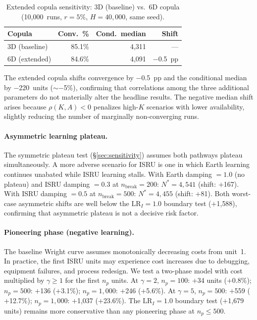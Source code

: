\documentclass[preprint,12pt]{elsarticle}
\begin{document}
\begin{table}[htbp]
\centering
\caption{Extended copula sensitivity: 3D (baseline) vs.\ 6D copula (10{,}000~runs, $r = 5\%$, $H = 40{,}000$, same seed).}
\label{tab:copula_6d}
\small
\begin{tabular}{@{}lrrr@{}}
\toprule
Copula & Conv.\ \% & Cond.\ median & Shift \\
\midrule
3D (baseline) & 85.1\% & 4{,}311 & --- \\
6D (extended) & 84.6\% & 4{,}091 & $-$0.5~pp \\
\bottomrule
\end{tabular}
\end{table}

The extended copula shifts convergence by $-$0.5~pp and the conditional median by $-$220~units (${\sim}-$5\%), confirming that correlations among the three additional parameters do not materially alter the headline results. The negative median shift arises because $\rho(K, A) < 0$ penalizes high-$K$ scenarios with lower availability, slightly reducing the number of marginally non-converging runs.

\paragraph{Asymmetric learning plateau.} The symmetric plateau test (\S\ref{sec:sensitivity}) assumes both pathways plateau simultaneously. A more adverse scenario for ISRU is one in which Earth learning continues unabated while ISRU learning stalls. With Earth damping $= 1.0$ (no plateau) and ISRU damping $= 0.3$ at $n_{\mathrm{break}} = 200$: $N^* = 4{,}541$ (shift: $+$167). With ISRU damping $= 0.5$ at $n_{\mathrm{break}} = 500$: $N^* = 4{,}455$ (shift: $+$81). Both worst-case asymmetric shifts are well below the $\mathrm{LR}_I = 1.0$ boundary test ($+$1{,}588), confirming that asymmetric plateau is not a decisive risk factor.

\paragraph{Pioneering phase (negative learning).} The baseline Wright curve assumes monotonically decreasing costs from unit~1. In practice, the first ISRU units may experience cost increases due to debugging, equipment failures, and process redesign. We test a two-phase model with cost multiplied by $\gamma \geq 1$ for the first $n_p$ units. At $\gamma = 2$, $n_p = 100$: $+$34 units ($+$0.8\%); $n_p = 500$: $+$136 ($+$3.1\%); $n_p = 1{,}000$: $+$246 ($+$5.6\%). At $\gamma = 5$, $n_p = 500$: $+$559 ($+$12.7\%); $n_p = 1{,}000$: $+$1{,}037 ($+$23.6\%). The $\mathrm{LR}_I = 1.0$ boundary test ($+$1{,}679 units) remains more conservative than any pioneering phase at $n_p \leq 500$.
\end{document}
